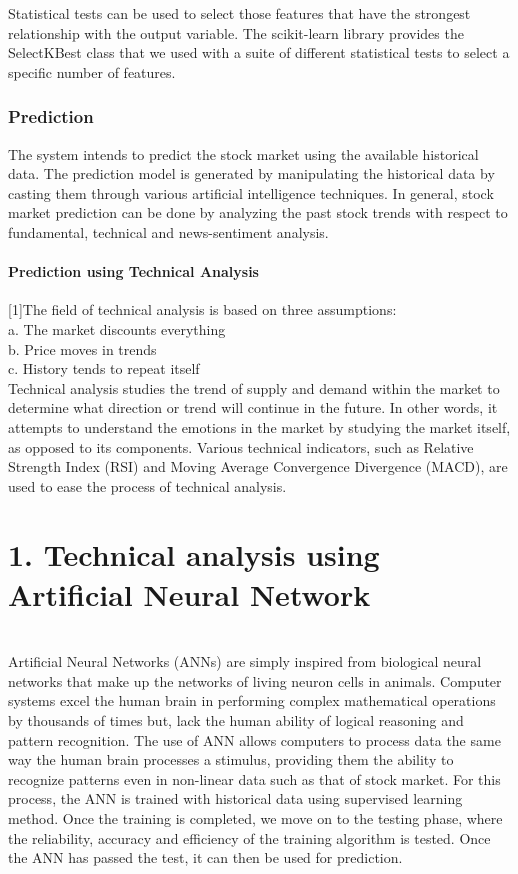 Statistical tests can be used to select those features that have the strongest relationship with the output variable. The scikit-learn library provides the SelectKBest class that we used with a suite of different statistical tests to select a specific number of features.

\subsection{Prediction}
The system intends to predict the stock market using the available historical data. The prediction model is generated by manipulating the historical data by casting them through various artificial intelligence techniques. In general, stock market prediction can be done by analyzing the past stock trends with respect to fundamental, technical and news-sentiment analysis. 
\subsubsection{Prediction using Technical Analysis }
[1]The field of technical analysis is based on three assumptions:\\
	a. The market discounts everything\\
	b. Price moves in trends\\
	c. History tends to repeat itself\\
Technical analysis studies the trend of supply and demand within the market to determine what direction or trend will continue in the future. In other words, it attempts to understand the emotions in the market by studying the market itself, as opposed to its components. Various technical indicators, such as Relative Strength Index (RSI) and Moving Average Convergence Divergence (MACD), are used to ease the process of technical analysis. 

\chapter{\textbf{1. Technical analysis using Artificial Neural Network  }}\\
Artificial Neural Networks (ANNs) are simply inspired from biological neural networks that make up the networks of living neuron cells in animals. Computer systems excel the human brain in performing complex mathematical operations by thousands of times but, lack the human ability of logical reasoning and pattern recognition. The use of ANN allows computers to process data the same way the human brain processes a stimulus, providing them the ability to recognize patterns even in non-linear data such as that of stock market. For this process, the ANN is trained with historical data using supervised learning method. Once the training is completed, we move on to the testing phase, where the reliability, accuracy and efficiency of the training algorithm is tested. Once the ANN has passed the test, it can then be used for prediction. 

